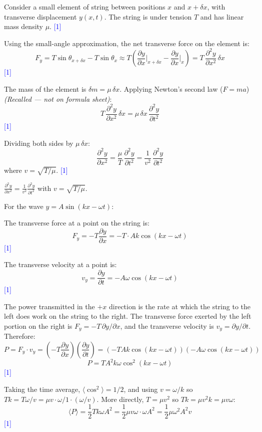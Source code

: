 \documentclass[12pt,a4paper]{article}
\newcommand{\markstep}[1]{\hfill\textcolor{blue}{[#1]}}
\newcommand{\finalanswer}[1]{%
  \begin{tcolorbox}[colback=green!5!white,colframe=green!50!black,boxrule=0.5pt]
  #1
  \end{tcolorbox}
}
\newcommand{\recalled}{\textit{(Recalled --- not on formula sheet)}}
\begin{document}
\begin{parts}
\item Consider a small element of string between positions $x$ and $x + \delta x$, with transverse displacement $y(x,t)$. The string is under tension $T$ and has linear mass density $\mu$. \markstep{1}

Using the small-angle approximation, the net transverse force on the element is:
\[
F_y = T\sin\theta_{x+\delta x} - T\sin\theta_x \approx T\left(\frac{\partial y}{\partial x}\bigg|_{x+\delta x} - \frac{\partial y}{\partial x}\bigg|_x\right) = T\,\frac{\partial^2 y}{\partial x^2}\,\delta x
\]
\markstep{1}

The mass of the element is $\delta m = \mu\,\delta x$. Applying Newton's second law ($F = ma$) \recalled:
\[
T\,\frac{\partial^2 y}{\partial x^2}\,\delta x = \mu\,\delta x\,\frac{\partial^2 y}{\partial t^2}
\]
\markstep{1}

Dividing both sides by $\mu\,\delta x$:
\[
\frac{\partial^2 y}{\partial x^2} = \frac{\mu}{T}\,\frac{\partial^2 y}{\partial t^2} = \frac{1}{v^2}\,\frac{\partial^2 y}{\partial t^2}
\]
where $v = \sqrt{T/\mu}$. \markstep{1}

\finalanswer{$\displaystyle\frac{\partial^2 y}{\partial x^2} = \frac{1}{v^2}\frac{\partial^2 y}{\partial t^2}$ \quad with $v = \sqrt{T/\mu}$.}

\item For the wave $y = A\sin(kx - \omega t)$:

The transverse force at a point on the string is:
\[
F_y = -T\frac{\partial y}{\partial x} = -T\cdot Ak\cos(kx - \omega t)
\]
\markstep{1}

The transverse velocity at a point is:
\[
v_y = \frac{\partial y}{\partial t} = -A\omega\cos(kx - \omega t)
\]
\markstep{1}

The power transmitted in the $+x$ direction is the rate at which the string to the left does work on the string to the right. The transverse force exerted by the left portion on the right is $F_y = -T\,\partial y/\partial x$, and the transverse velocity is $v_y = \partial y/\partial t$. Therefore:
\[
P = F_y \cdot v_y = \left(-T\frac{\partial y}{\partial x}\right)\left(\frac{\partial y}{\partial t}\right) = (-TAk\cos(kx-\omega t))(-A\omega\cos(kx-\omega t))
\]
\[
P = T A^2 k\omega\cos^2(kx-\omega t)
\]
\markstep{1}

Taking the time average, $\langle\cos^2\rangle = 1/2$, and using $v = \omega/k$ so $Tk = T\omega/v = \mu v\cdot\omega/1\cdot(\omega/v)$. More directly, $T = \mu v^2$ so $Tk = \mu v^2 k = \mu v\omega$:
\[
\langle P\rangle = \frac{1}{2}T k\omega A^2 = \frac{1}{2}\mu v\omega\cdot\omega A^2 = \frac{1}{2}\mu\omega^2 A^2 v
\]
\markstep{1}


\end{parts}
\end{document}

